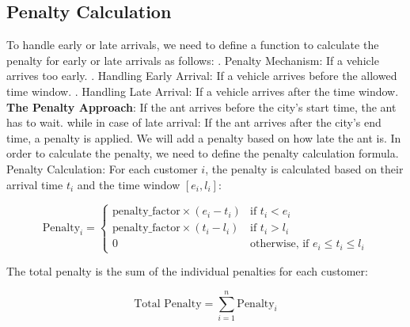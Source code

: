 \subsection{Penalty Calculation}
To handle early or late arrivals, we need to define a function to calculate the penalty for early or late arrivals as follows:
\newline
{}. Penalty Mechanism: If a vehicle arrives too early.
. Handling Early Arrival: If a vehicle arrives before the allowed time window.
. Handling Late Arrival: If a vehicle arrives after the time window.
\newline
\newline
\textbf{The Penalty Approach}:
If the ant arrives before the city's start time, the ant has to wait. while in case of late arrival: If the ant arrives after the city's end time, a penalty is applied. We will add a penalty based on how late the ant is.
\newline
In order to calculate the penalty, we need to define the penalty calculation formula.
\newline
Penalty Calculation:
For each customer \(i\), the penalty is calculated based on their arrival time \(t_i\) and the time window \([e_i, l_i]\):

\[
\text{Penalty}_i =
\begin{cases}
\text{penalty\_factor} \times (e_i - t_i) & \text{if } t_i < e_i \\
\text{penalty\_factor} \times (t_i - l_i) & \text{if } t_i > l_i \\
0 & \text{otherwise, if } e_i \leq t_i \leq l_i
\end{cases}
\]

The total penalty is the sum of the individual penalties for each customer:

\[
\text{Total Penalty} = \sum_{i=1}^{n} \text{Penalty}_i
\]
